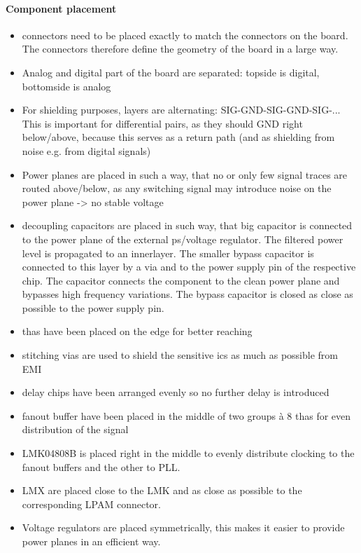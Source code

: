\paragraph{Component placement}
\begin{itemize}
\item connectors need to be placed exactly to match the connectors on the board. The connectors therefore define the geometry of the board in a large way.
\item Analog and digital part of the board are separated: topside is digital, bottomside is analog
\item For shielding purposes, layers are alternating: SIG-GND-SIG-GND-SIG-... This is important for differential pairs, as they should GND right below/above, because this serves as a return path (and as shielding from noise e.g. from digital signals)
\item Power planes are placed in such a way, that no or only few signal traces are routed above/below, as any switching signal may introduce noise on the power plane -> no stable voltage
\item decoupling capacitors are placed in such way, that big capacitor is connected to the power plane of the external ps/voltage regulator. The filtered power level is propagated to an innerlayer. The smaller bypass capacitor is connected to this layer by a via and to the power supply pin of the respective chip. The capacitor connects the component to the clean power plane and bypasses high frequency variations. The bypass capacitor is closed as close as possible to the power supply pin.
\item \glspl{tha} have been placed on the edge for better reaching
\item stitching vias are used to shield the sensitive \glspl{ic} as much as possible from EMI
\item delay chips have been arranged evenly so no further delay is introduced 
\item fanout buffer have been placed in the middle of two groups à 8 \glspl{tha} for even distribution of the signal
\item LMK04808B is placed right in the middle to evenly distribute clocking to the fanout buffers and the other to PLL.
\item LMX are placed close to the LMK and as close as possible to the corresponding LPAM connector.
\item Voltage regulators are placed symmetrically, this makes it easier to provide power planes in an efficient way.
\end{itemize}
